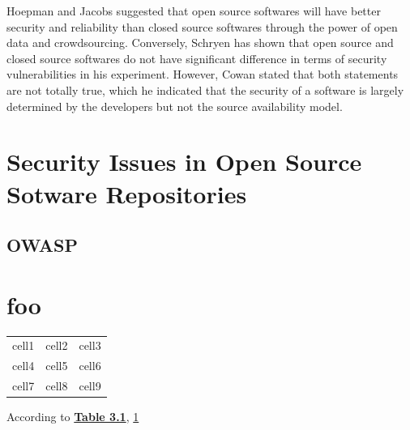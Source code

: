 \documentclass[12pt, a4paper]{report}
\begin{document}
Hoepman and Jacobs \cite{hoepman_2007} suggested that open source softwares will have better
security and reliability than closed source softwares through the power of open data and
crowdsourcing. Conversely, Schryen \cite{schryen_2011} has shown that open source and closed source
softwares do not have significant difference in terms of security vulnerabilities in his experiment.
However, Cowan \cite{cowan_2003} stated that both statements are not totally true, which he
indicated that the security of a software is largely determined by the developers but not the source
availability model.

\section{Security Issues in Open Source Sotware Repositories}
\subsection{OWASP}

\section{foo}
\begin{table}[H]
	\begin{center}
		\begin{tabular}{ c c c }
			cell1 & cell2 & cell3 \\
      cell4 & cell5 & cell6 \\
			cell7 & cell8 & cell9
		\end{tabular}
		 \label{table:celltable}
	\end{center}
\end{table}

According to \hyperref[table:celltable]{\textbf{Table 3.1}}, \ref{table:celltable}






\printbibliography[heading=bibintoc]
\end{document}
